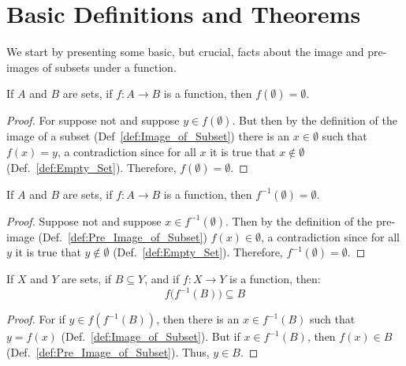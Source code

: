 \section{Basic Definitions and Theorems}
    We start by presenting some basic, but crucial, facts about the image and
    pre-images of subsets under a function.
    \begin{theorem}
        \label{thm:Image_of_Empty_Set_Is_Empty}%
        If $A$ and $B$ are sets, if $f:A\rightarrow{B}$ is a function,
        then $f(\emptyset)=\emptyset$.
    \end{theorem}
    \begin{proof}
        For suppose not and suppose $y\in{f}(\emptyset)$. But then by the
        definition of the image of a subset (Def~\ref{def:Image_of_Subset})
        there is an $x\in\emptyset$ such that $f(x)=y$, a contradiction since
        for all $x$ it is true that $x\notin\emptyset$
        (Def.~\ref{def:Empty_Set}). Therefore, $f(\emptyset)=\emptyset$.
    \end{proof}
    \begin{theorem}
        \label{thm:Pre_Image_of_Empty_Set_Is_Empty}%
        If $A$ and $B$ are sets, if $f:A\rightarrow{B}$ is a function, then
        $f^{\minus{1}}(\emptyset)=\emptyset$.
    \end{theorem}
    \begin{proof}
        Suppose not and suppose $x\in{f}^{\minus{1}}(\emptyset)$. Then by the
        definition of the pre-image (Def.~\ref{def:Pre_Image_of_Subset})
        $f(x)\in\emptyset$, a contradiction since for all $y$ it is true that
        $y\notin\emptyset$ (Def.~\ref{def:Empty_Set}). Therefore,
        $f^{\minus{1}}(\emptyset)=\emptyset$.
    \end{proof}
    \begin{theorem}
        \label{thm:Image_of_PreImage_is_Subset}%
        If $X$ and $Y$ are sets, if $B\subseteq{Y}$, and if $f:X\rightarrow{Y}$
        is a function, then:
        \begin{equation}
            f\big(f^{\minus{1}}(B)\big)\subseteq{B}
        \end{equation}
    \end{theorem}
    \begin{proof}
        For if $y\in{f(f^{\minus{1}}(B))}$, then there is an
        $x\in{f^{\minus{1}}(B)}$ such that $y=f(x)$
        (Def.~\ref{def:Image_of_Subset}). But if $x\in{f^{\minus{1}}(B)}$, then
        $f(x)\in{B}$ (Def.~\ref{def:Pre_Image_of_Subset}). Thus, $y\in{B}$.
    \end{proof}
